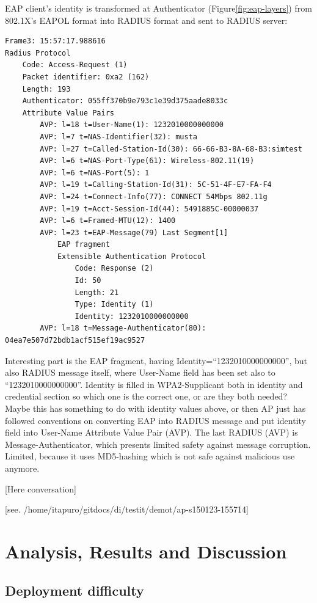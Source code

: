 \documentclass[12pt,a4paper,english]{tutthesis}
\begin{document}
\begin{otherlanguage}{english}
EAP client's identity is transformed at Authenticator (Figure\ref{fig:eap-layers}) from 802.1X's 
EAPOL format  into RADIUS format and
sent to RADIUS server:
\begin{verbatim}
Frame3: 15:57:17.988616
Radius Protocol
    Code: Access-Request (1)
    Packet identifier: 0xa2 (162)
    Length: 193
    Authenticator: 055ff370b9e793c1e39d375aade8033c
    Attribute Value Pairs
        AVP: l=18 t=User-Name(1): 1232010000000000
        AVP: l=7 t=NAS-Identifier(32): musta
        AVP: l=27 t=Called-Station-Id(30): 66-66-B3-8A-68-B3:simtest
        AVP: l=6 t=NAS-Port-Type(61): Wireless-802.11(19)
        AVP: l=6 t=NAS-Port(5): 1
        AVP: l=19 t=Calling-Station-Id(31): 5C-51-4F-E7-FA-F4
        AVP: l=24 t=Connect-Info(77): CONNECT 54Mbps 802.11g
        AVP: l=19 t=Acct-Session-Id(44): 5491885C-00000037
        AVP: l=6 t=Framed-MTU(12): 1400
        AVP: l=23 t=EAP-Message(79) Last Segment[1]
            EAP fragment
            Extensible Authentication Protocol
                Code: Response (2)
                Id: 50
                Length: 21
                Type: Identity (1)
                Identity: 1232010000000000
        AVP: l=18 t=Message-Authenticator(80): 04ea7e507d72bdb1acf515ef19ac9527
\end{verbatim}
Interesting part is the EAP fragment, having
Identity=``1232010000000000'', but
also RADIUS message itself, where User-Name field has been set also 
to ``1232010000000000''. 
Identity is filled in WPA2-Supplicant both in identity and credential
section so which one is the correct one, or are they both needed?
Maybe this has something to do with identity
values above, or then AP just has followed conventions on converting
EAP into RADIUS message and put identity field into User-Name Attribute Value Pair (AVP).
The last RADIUS (AVP) is 
Message-Authenticator, which presents limited safety against message 
corruption. Limited, because it uses MD5-hashing which is not safe
against malicious use anymore.

[Here conversation]



[see. /home/itapuro/gitdocs/di/testit/demot/ap-s150123-155714]


\chapter{Analysis, Results and Discussion}
\label{sec-6}



\section{Deployment difficulty}
\label{sec-6-1}


\end{otherlanguage}
\end{document}
